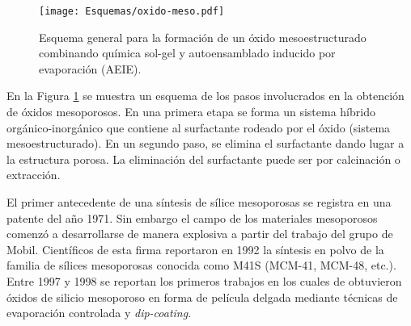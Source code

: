 				\begin{figure}[h!]
 				\begin{center}
 				\texttt{[image: Esquemas/oxido-meso.pdf]}
 				\caption[Esquema general para la formación de un óxido mesoestructurado]{Esquema general para la formación de un óxido mesoestructurado combinando química sol-gel y autoensamblado inducido por evaporación (AEIE).}
 		   		\label{fig:oxmeso}
 		    	\end{center}
 		    	\end{figure}

	\pagebreak En la Figura \ref{fig:oxmeso} se muestra un esquema de los pasos involucrados en la obtención de óxidos mesoporosos. En una primera etapa se forma un sistema híbrido orgánico-inorgánico que contiene al surfactante rodeado por el óxido (sistema mesoestructurado). En un segundo paso, se elimina el surfactante dando lugar a la estructura porosa. La eliminación del surfactante puede ser por calcinación o extracción.

		 

    El primer antecedente de una síntesis de sílice mesoporosas se registra en una patente del año 1971. Sin embargo el campo de los materiales mesoporosos comenzó a desarrollarse de manera explosiva a partir del trabajo del grupo de Mobil. Científicos de esta firma reportaron en 1992 la síntesis en polvo de la familia de sílices mesoporosas conocida como M41S (MCM-41, MCM-48, etc.). Entre 1997 y 1998 se reportan los primeros trabajos en los cuales de obtuvieron óxidos de silicio mesoporoso en forma de película delgada mediante técnicas de evaporación controlada y \textit{dip-coating}.\cite{Lu1997,Zhao1998a,Zhao1998,Brinker1999} 

